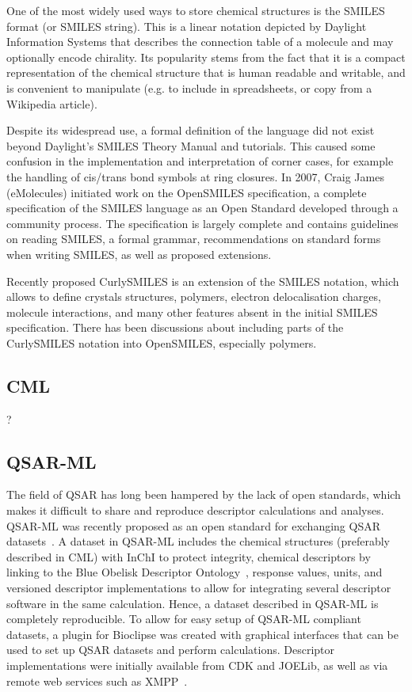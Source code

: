 \documentclass[10pt]{bmc_article}
\newenvironment{bmcformat}{\fussy\setboolean{publ}{true}}{\fussy}
\begin{document}
\begin{bmcformat}
One of the most widely used ways to store chemical structures is the
SMILES format (or SMILES string). This is a linear notation depicted
by Daylight Information Systems that describes the connection table
of a molecule and may optionally encode chirality. Its popularity
stems from the fact that it is a compact representation of the
chemical structure that is human readable and writable, and is
convenient to manipulate (e.g. to include in spreadsheets, or copy
from a Wikipedia article).

Despite its widespread use, a formal
definition of the language did not exist beyond Daylight's SMILES
Theory Manual and tutorials. This caused some confusion in the
implementation and interpretation of corner cases, for example the
handling of cis/trans bond symbols at ring closures. In 2007, Craig
James (eMolecules) initiated work on the OpenSMILES specification, a
complete specification of the SMILES language as an Open Standard
developed through a community process. The specification is largely
complete and contains guidelines on reading SMILES, a formal
grammar, recommendations on standard forms when writing SMILES, as
well as proposed extensions.

Recently proposed CurlySMILES\cite{CurlySMILES} is an extension of the
SMILES notation, which allows to define crystals structures, polymers,
electron delocalisation charges, molecule interactions, and many other
features absent in the initial SMILES specification. There has been
discussions about including parts of the CurlySMILES notation into
OpenSMILES, especially polymers.

\subsection*{CML}
?

\subsection*{QSAR-ML}
The field of QSAR has long been hampered by the lack of open standards, which makes it difficult to share and reproduce descriptor calculations and analyses. QSAR-ML was recently proposed as an open standard for exchanging QSAR datasets~\cite{Spjuth:2010uq}. A dataset in QSAR-ML includes the chemical structures (preferably described in CML) with InChI to protect integrity, chemical descriptors by linking to the Blue Obelisk Descriptor Ontology~\cite{bodo}, response values, units, and versioned descriptor implementations to allow for integrating several descriptor software in the same calculation. Hence, a dataset described in QSAR-ML is completely reproducible. To allow for easy setup of QSAR-ML compliant datasets, a plugin for Bioclipse was created with graphical interfaces that can be used to set up QSAR datasets and perform calculations. Descriptor implementations were initially available from CDK and JOELib, as well as via remote web services such as XMPP~\cite{Wagener:2009uq}.


\end{bmcformat}
\end{document}
